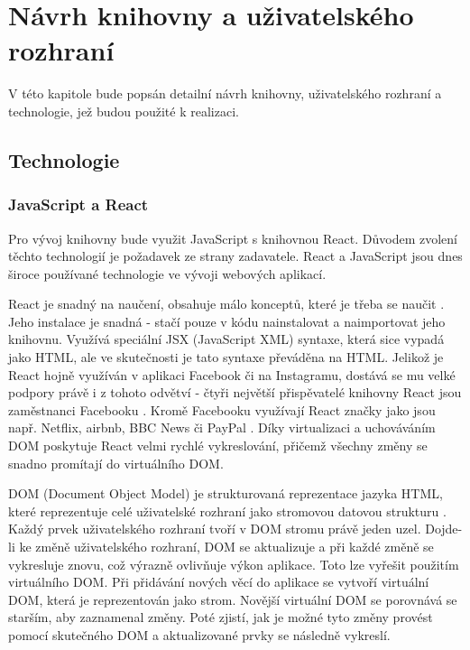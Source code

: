 \documentclass[czech, bc, kiv, he, iso690numb]{fasthesis}
\begin{document}
%
%
%
%
\chapter{Návrh knihovny a uživatelského rozhraní}

V této kapitole bude popsán detailní návrh knihovny, uživatelského rozhraní a technologie, jež budou použité k realizaci. 

\section{Technologie}

\subsection{JavaScript a React}
Pro vývoj knihovny bude využit JavaScript s knihovnou React. Důvodem zvolení těchto technologií je požadavek ze strany zadavatele. React a JavaScript jsou dnes
široce používané technologie ve vývoji webových aplikací. 

React je snadný na naučení, obsahuje málo konceptů, které je třeba se naučit \cite{whyUsingReact}. Jeho instalace je snadná -
stačí pouze v kódu nainstalovat a naimportovat jeho knihovnu. Využívá speciální JSX (JavaScript XML) syntaxe, která sice vypadá jako HTML, ale ve skutečnosti je tato syntaxe převáděna na HTML. Jelikož je React hojně využíván
v aplikaci Facebook či na Instagramu, dostává se mu velké podpory právě i z tohoto odvětví - čtyři největší přispěvatelé knihovny React jsou zaměstnanci Facebooku \cite{whyUsingReact}. Kromě 
Facebooku využívají React značky jako jsou např. Netflix, airbnb, BBC News či PayPal \cite{whyUsingReact2}. Díky virtualizaci a uchováváním DOM poskytuje React
velmi rychlé vykreslování, přičemž všechny změny se snadno promítají do virtuálního DOM. 

DOM (Document Object Model) je strukturovaná reprezentace jazyka HTML, které reprezentuje celé uživatelské rozhraní jako stromovou datovou strukturu \cite{whatIsDOM}. Každý prvek uživatelského
rozhraní tvoří v DOM stromu právě jeden uzel. Dojde-li ke změně uživatelského rozhraní, DOM se aktualizuje 	a při každé změně se vykresluje znovu, což výrazně ovlivňuje výkon aplikace. 
Toto lze vyřešit použitím virtuálního DOM. Při přidávání nových věcí do aplikace se vytvoří virtuální DOM, která je reprezentován jako strom. Novější virtuální DOM se porovnává se starším, aby
zaznamenal změny. Poté zjistí, jak je možné tyto změny provést pomocí skutečného DOM a aktualizované prvky se následně vykreslí.
\end{document}
